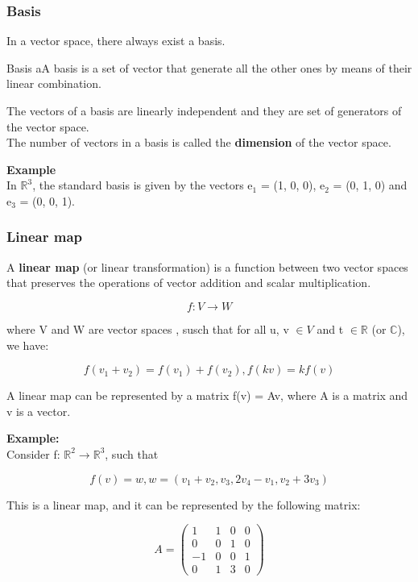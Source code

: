 \subsubsection{Basis}
In a vector space, there always exist a basis.

\begin{defBox}{Basis}
    aA basis is a set of vector that generate all the other ones by means of their linear combination.
\end{defBox}

\noindent
The vectors of a basis are linearly independent and they are set of generators of the vector space.\\
The number of vectors in a basis is called the \textbf{dimension} of the vector space.
\medskip

\noindent
\textbf{Example}\\
In $\mathbb{R}^3$, the standard basis is given by the vectors e$_1$ = (1, 0, 0), e$_2$ = (0, 1, 0) and e$_3$ = (0, 0, 1).

\subsubsection{Linear map}
A \textbf{linear map} (or linear transformation) is a function between two vector spaces that preserves the operations of vector addition and scalar multiplication.
\begin{center}
    \[
    f: V \rightarrow W
    \]
\end{center}

\noindent
where V and W are vector spaces , susch that for all u, v $\in V$ and t $\in \mathbb{R}$ (or $\mathbb{C}$), we have:
\begin{center}
    \[
    f(v_1 + v_2) = f(v_1) + f(v_2), f(kv) = kf(v)
    \]
\end{center}

\noindent
A linear map can be represented by a matrix f(v) = Av, where A is a matrix and v is a vector.
\medskip

\noindent
\textbf{Example:}\\
Consider f: $\mathbb{R}^2 \rightarrow \mathbb{R}^3$, such that
\begin{center}
    \[
    f(v) = w, w = (v_1 + v_2, v_3, 2v_4 - v_1, v_2 + 3v_3)
    \]
\end{center}
\noindent
This is a linear map, and it can be represented by the following matrix:
\begin{center}
    \[
    A = \begin{pmatrix}
    1 & 1 & 0 & 0 \\
    0 & 0 & 1 & 0 \\
    -1 & 0 & 0 & 1 \\
    0 & 1 & 3 & 0
    \end{pmatrix}
    \]
\end{center}

